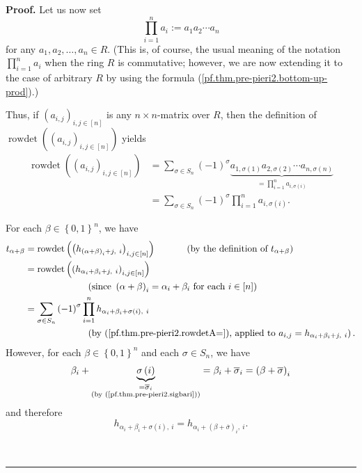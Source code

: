 \documentclass
[numbers=enddot,12pt,final,onecolumn,notitlepage,english]{scrartcl}%
\theoremstyle{definition}
\newenvironment{proof}[1][Proof]{\noindent\textbf{#1.} }{\ \rule{0.5em}{0.5em}}
\let\sumnonlimits\sum
\let\prodnonlimits\prod
\renewcommand{\sum}{\sumnonlimits\limits}
\renewcommand{\prod}{\prodnonlimits\limits}
\newenvironment{verlong}{}{}
\begin{document}
\begin{verlong}
\begin{proof}
Let us now set%
\begin{equation}
\prod_{i=1}^{n}a_{i}:=a_{1}a_{2}\cdots a_{n}
\label{pf.thm.pre-pieri2.bottom-up-prod}%
\end{equation}
for any $a_{1},a_{2},\ldots,a_{n}\in R$. (This is, of course, the usual
meaning of the notation $\prod_{i=1}^{n}a_{i}$ when the ring $R$ is
commutative; however, we are now extending it to the case of arbitrary $R$ by
using the formula (\ref{pf.thm.pre-pieri2.bottom-up-prod}).)

Thus, if $\left(  a_{i,j}\right)  _{i,j\in\left[  n\right]  }$ is any $n\times
n$-matrix over $R$, then the definition of $\operatorname*{rowdet}\left(
\left(  a_{i,j}\right)  _{i,j\in\left[  n\right]  }\right)  $ yields%
\begin{align}
\operatorname*{rowdet}\left(  \left(  a_{i,j}\right)  _{i,j\in\left[
n\right]  }\right)   &  =\sum_{\sigma\in S_{n}}\left(  -1\right)  ^{\sigma
}\underbrace{a_{1,\sigma\left(  1\right)  }a_{2,\sigma\left(  2\right)
}\cdots a_{n,\sigma\left(  n\right)  }}_{=\prod_{i=1}^{n}a_{i,\sigma\left(
i\right)  }}\nonumber\\
&  =\sum_{\sigma\in S_{n}}\left(  -1\right)  ^{\sigma}\prod_{i=1}%
^{n}a_{i,\sigma\left(  i\right)  }. \label{pf.thm.pre-pieri2.rowdetA=}%
\end{align}


For each $\beta\in\left\{  0,1\right\}  ^{n}$, we have%
\begin{align}
t_{\alpha+\beta}  &  =\operatorname*{rowdet}\left(  \left(  h_{\left(
\alpha+\beta\right)  _{i}+j,\ i}\right)  _{i,j\in\left[  n\right]  }\right)
\ \ \ \ \ \ \ \ \ \ \left(  \text{by the definition of }t_{\alpha+\beta
}\right) \nonumber\\
&  =\operatorname*{rowdet}\left(  \left(  h_{\alpha_{i}+\beta_{i}%
+j,\ i}\right)  _{i,j\in\left[  n\right]  }\right) \nonumber\\
&  \ \ \ \ \ \ \ \ \ \ \ \ \ \ \ \ \ \ \ \ \left(  \text{since }\left(
\alpha+\beta\right)  _{i}=\alpha_{i}+\beta_{i}\text{ for each }i\in\left[
n\right]  \right) \nonumber\\
&  =\sum_{\sigma\in S_{n}}\left(  -1\right)  ^{\sigma}\prod_{i=1}^{n}%
h_{\alpha_{i}+\beta_{i}+\sigma\left(  i\right)  ,\ i}%
\label{pf.thm.pre-pieri2.t1}\\
&  \ \ \ \ \ \ \ \ \ \ \ \ \ \ \ \ \ \ \ \ \left(  \text{by
(\ref{pf.thm.pre-pieri2.rowdetA=}), applied to }a_{i,j}=h_{\alpha_{i}%
+\beta_{i}+j,\ i}\right)  .\nonumber
\end{align}
However, for each $\beta\in\left\{  0,1\right\}  ^{n}$ and each $\sigma\in
S_{n}$, we have%
\[
\beta_{i}+\underbrace{\sigma\left(  i\right)  }_{\substack{=\overline{\sigma
}_{i}\\\text{(by (\ref{pf.thm.pre-pieri2.sigbari}))}}}=\beta_{i}%
+\overline{\sigma}_{i}=\left(  \beta+\overline{\sigma}\right)  _{i}%
\]
and therefore%
\begin{equation}
h_{\alpha_{i}+\beta_{i}+\sigma\left(  i\right)  ,\ i}=h_{\alpha_{i}+\left(
\beta+\overline{\sigma}\right)  _{i},\ i}. \label{pf.thm.pre-pieri2.h=h1}%
\end{equation}



\end{proof}
\end{verlong}
\end{document}
